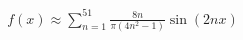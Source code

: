 \documentclass[preview]{standalone}
\begin{document}
\begin{align*}
f(x) \approx \sum_{n=1}^{51} \frac{8n}{\pi(4n^2-1)} \sin(2nx)
\end{align*}
\end{document}
